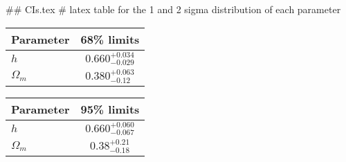 ## CIs.tex
# latex table for the 1 and 2 sigma distribution of each parameter

\begin{tabular} { l  c}
 Parameter &  68\% limits\\
\hline
{\boldmath$h              $} & $0.660^{+0.034}_{-0.029}   $\\
{\boldmath$\Omega_m       $} & $0.380^{+0.063}_{-0.12}    $\\
\hline
\end{tabular}

\begin{tabular} { l  c}
 Parameter &  95\% limits\\
\hline
{\boldmath$h              $} & $0.660^{+0.060}_{-0.067}   $\\
{\boldmath$\Omega_m       $} & $0.38^{+0.21}_{-0.18}      $\\
\hline
\end{tabular}
